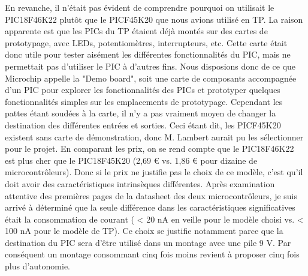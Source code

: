 \documentclass[a4paper,11pt,titlepage]{article}
\begin{document}
En revanche, il n'était pas évident de comprendre pourquoi on utilisait le PIC18F46K22 plutôt que le PICF45K20 que nous avions utilisé en TP. La raison apparente est que les PICs du TP étaient déjà montés sur des cartes de prototypage, avec LEDs, potentiomètres, interrupteurs, etc. Cette carte était donc utile pour tester aisément les différentes fonctionnalités du PIC, mais ne permettait pas d'utiliser le PIC à d'autres fins. Nous disposions donc de ce que Microchip appelle la "Demo board", soit une carte de composants accompagnée d'un PIC pour explorer les fonctionnalités des PICs et prototyper quelques fonctionnalités simples sur les emplacements de prototypage. Cependant les pattes étant soudées à la carte, il n'y a pas vraiment moyen de changer la destination des différentes entrées et sorties.
Ceci étant dit, les PICF45K20 existent sans carte de démonstration, donc M. Lambert aurait pu les sélectionner pour le projet.
En comparant les prix, on se rend compte que le PIC18F46K22 est plus cher que le PIC18F45K20 (2,69 € vs. 1,86 € pour dizaine de microcontrôleurs). Donc si le prix ne justifie pas le choix de ce modèle, c'est qu'il doit avoir des caractéristiques intrinsèques différentes. Après examination attentive des premières pages de la datasheet des deux microcontrôleurs, je suis arrivé à déterminé que la seule différence dans les caractéristiques significatives était la consommation de courant ( < 20 nA en veille pour le modèle choisi vs. < 100 nA pour le modèle de TP).
Ce choix se justifie notamment parce que la destination du PIC sera d'être utilisé dans un montage avec une pile 9 V. Par conséquent un montage consommant cinq fois moins revient à proposer cinq fois plus d'autonomie. 
\end{document}
